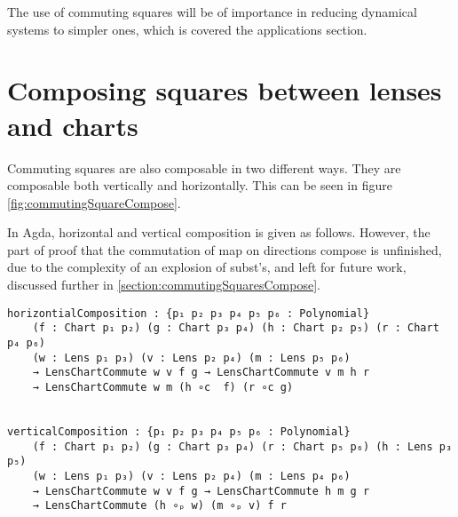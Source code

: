 The use of commuting squares will be of importance in reducing dynamical systems to simpler ones, which is covered the applications section. 

\section{Composing squares between lenses and charts}
Commuting squares are also composable in two different ways. They are composable both vertically and horizontally. This can be seen in figure \ref{fig:commutingSquareCompose}.

%      
In Agda, horizontal and vertical composition is given as follows. However, the part of proof that the commutation of map on directions compose is unfinished, due to the complexity of an explosion of subst's, and left for future work, discussed further in \ref{section:commutingSquaresCompose}.

\begin{verbatim}
horizontialComposition : {p₁ p₂ p₃ p₄ p₅ p₆ : Polynomial}
    (f : Chart p₁ p₂) (g : Chart p₃ p₄) (h : Chart p₂ p₅) (r : Chart p₄ p₆)
    (w : Lens p₁ p₃) (v : Lens p₂ p₄) (m : Lens p₅ p₆)
    → LensChartCommute w v f g → LensChartCommute v m h r
    → LensChartCommute w m (h ∘c  f) (r ∘c g)


verticalComposition : {p₁ p₂ p₃ p₄ p₅ p₆ : Polynomial}
    (f : Chart p₁ p₂) (g : Chart p₃ p₄) (r : Chart p₅ p₆) (h : Lens p₃ p₅)
    (w : Lens p₁ p₃) (v : Lens p₂ p₄) (m : Lens p₄ p₆)
    → LensChartCommute w v f g → LensChartCommute h m g r
    → LensChartCommute (h ∘ₚ w) (m ∘ₚ v) f r
\end{verbatim}


